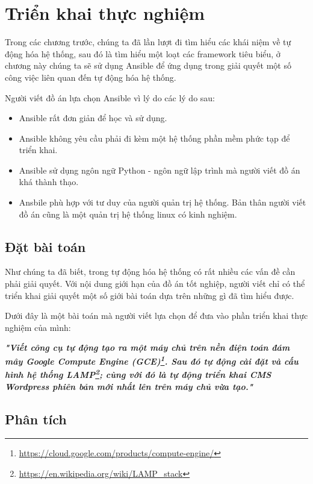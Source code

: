 \chapter{Triển khai thực nghiệm}
\newpage
\clearpage

Trong các chương trước, chúng ta đã lần lượt đi tìm hiểu các khái niệm về tự động hóa hệ thống, sau đó là tìm hiểu một loạt các framework tiêu biểu, ở chương này chúng ta sẽ sử dụng Ansible để ứng dụng trong giải quyết một số công việc liên quan đến tự động hóa hệ thống.

Người viết đồ án lựa chọn Ansible vì lý do các lý do sau:

\begin{itemize}
\item Ansible rất đơn giản để học và sử dụng.
\item Ansible không yêu cầu phải đi kèm một hệ thống phần mềm phức tạp để triển khai.
\item Ansible sử dụng ngôn ngữ Python - ngôn ngữ lập trình mà người viết đồ án khá thành thạo.
\item Ansbile phù hợp với tư duy của người quản trị hệ thống. Bản thân người viết đồ án cũng là một quản trị hệ thống linux có kinh nghiệm.
\end{itemize}

\newpage
\clearpage

\section{Đặt bài toán}

Như chúng ta đã biết, trong tự động hóa hệ thống có rất nhiều các vấn đề cần phải giải quyết. Với nội dung giới hạn của đồ án tốt nghiệp, người viết chỉ có thể triển khai giải quyết một số giới bài toán dựa trên những gì đã tìm hiểu được.

Dưới đây là một bài toán mà người viết lựa chọn để đưa vào phần triển khai thực nghiệm của mình:


\emph{\textbf{"Viết công cụ tự động tạo ra một máy chủ trên nền điện toán đám mây Google Compute Engine (GCE)\footnote{\url{https://cloud.google.com/products/compute-engine/}}. Sau đó tự động cài đặt và cấu hình hệ thống LAMP\footnote{\url{https://en.wikipedia.org/wiki/LAMP_stack}}; cùng với đó là tự động triển khai CMS Wordpress phiên bản mới nhất lên trên máy chủ vừa tạo."}}

\section{Phân tích}


